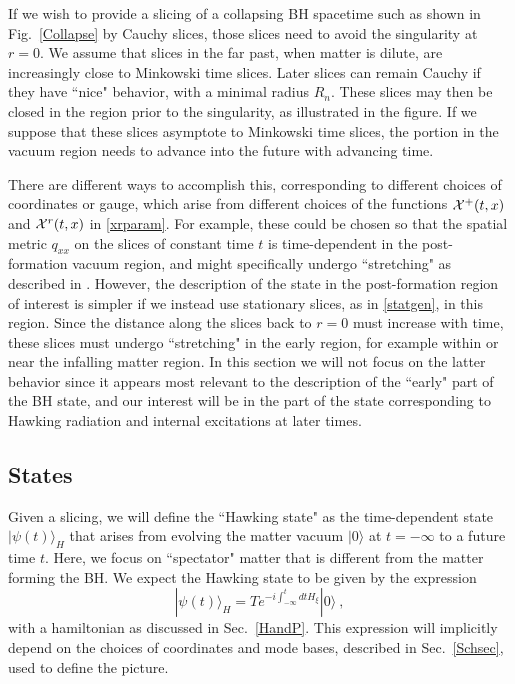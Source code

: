 \documentclass[11pt]{article}
\numberwithin{equation}{section}
\newcommand{\beq}{\begin{equation}}
\newcommand{\eeq}{\end{equation}}
\begin{document}
If we wish to provide a slicing of a collapsing BH spacetime such as shown in Fig.~\ref{Collapse} by Cauchy slices, those slices need to avoid the singularity at $r=0$.  
We assume that slices in the far past, when matter is dilute, are increasingly close to Minkowski time slices.  Later slices can remain Cauchy
 if they have ``nice" behavior, with a minimal radius $R_n$. These slices may then be closed in the region prior to the singularity, as illustrated in the figure.  If we suppose that these slices asymptote to Minkowski time slices, the portion in the vacuum region needs to advance  into the future with advancing time.  




There are different ways to accomplish this, corresponding to different choices of coordinates or gauge, which arise from different choices of the functions ${\cal X}^+(t,x)$ and ${\cal X}^r(t,x)$ in \eqref{xrparam}.  For example, these could be chosen so that the spatial metric $q_{xx}$ on the slices of constant time $t$ is time-dependent in the post-formation vacuum region, and might specifically undergo ``stretching" as described in \cite{Mathinforev}.  However, the description of the state in the post-formation region of interest is simpler if we instead use stationary slices, as in \eqref{statgen}, in this region.  Since the distance along the slices back to $r=0$ must increase with time, these slices must undergo ``stretching" in the early region, for example within or near the infalling matter region.  In this section we will not focus on the latter behavior since it appears most relevant to the description of the ``early" part of the BH state, and our interest will be in the part of the state corresponding to Hawking radiation and internal excitations at later times.

\subsection{States}

Given a slicing, we will define the ``Hawking state" as the time-dependent state $|\psi(t)\rangle_H$ that arises from evolving the matter vacuum $|0\rangle$ at $t=-\infty$ to a future time $t$.  Here, we focus on ``spectator" matter that is different from the matter forming the BH.  We expect the Hawking state to be given by the expression
\beq\label{Hevol}
|\psi(t)\rangle_H = T e^{ -i \int_{-\infty}^tdt H_\xi}|0\rangle\ ,
\eeq
with a hamiltonian as discussed in Sec.~\ref{HandP}.  This expression will implicitly depend on the choices of coordinates and mode bases, described in Sec.~\ref{Schsec}, used to define the picture.
\end{document}
